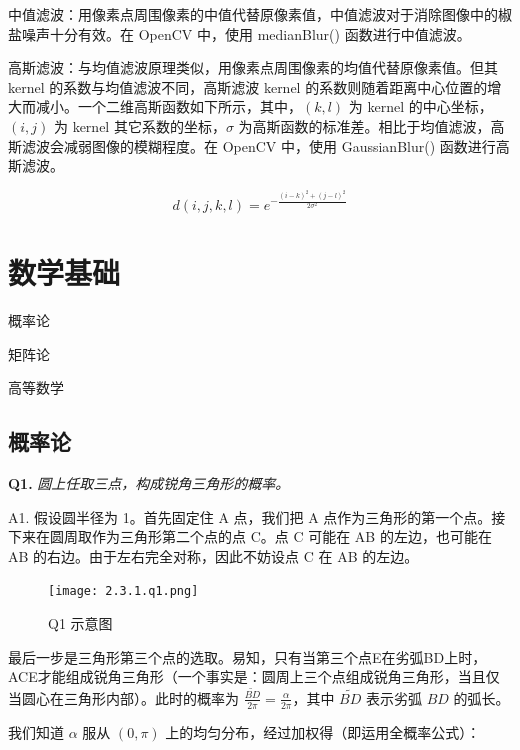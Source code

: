 \documentclass[cn,10pt,math=newtx,citestyle=gb7714-2015,bibstyle=gb7714-2015]{elegantbook}
\begin{document}
中值滤波：用像素点周围像素的中值代替原像素值，中值滤波对于消除图像中的椒盐噪声十分有效。在 OpenCV 中，使用 medianBlur() 函数进行中值滤波。

高斯滤波：与均值滤波原理类似，用像素点周围像素的均值代替原像素值。但其 kernel 的系数与均值滤波不同，高斯滤波 kernel 的系数则随着距离中心位置的增大而减小。一个二维高斯函数如下所示，其中，$(k, l)$ 为 kernel 的中心坐标，$(i, j)$ 为 kernel 其它系数的坐标，$\sigma$ 为高斯函数的标准差。相比于均值滤波，高斯滤波会减弱图像的模糊程度。在 OpenCV 中，使用 GaussianBlur() 函数进行高斯滤波。

\begin{equation}
d(i, j, k, l)=e^{-\frac{(i-k)^{2}+(j-l)^{2}}{2 \sigma^{2}}}
\end{equation}


\newpage


\section{数学基础}

\begin{introduction}
\item 概率论
\item 矩阵论
\item 高等数学
\end{introduction}

\subsection{概率论}

\textbf{Q1.} \textit{圆上任取三点，构成锐角三角形的概率。}

A1. 假设圆半径为 1。首先固定住 A 点，我们把 A 点作为三角形的第一个点。接下来在圆周取作为三角形第二个点的点 C。点 C 可能在 AB 的左边，也可能在 AB 的右边。由于左右完全对称，因此不妨设点 C 在 AB 的左边。

\begin{figure}[ht]
  \centering
  \texttt{[image: 2.3.1.q1.png]}
  \caption{Q1 示意图}
\end{figure}

最后一步是三角形第三个点的选取。易知，只有当第三个点E在劣弧BD上时，ACE才能组成锐角三角形（一个事实是：圆周上三个点组成锐角三角形，当且仅当圆心在三角形内部）。此时的概率为 $\frac{\tilde{BD}}{2\pi}=\frac{\alpha}{2\pi}$，其中 $\tilde{BD}$ 表示劣弧 $BD$ 的弧长。

我们知道 $\alpha$ 服从 $(0,\pi)$ 上的均匀分布，经过加权得（即运用全概率公式）：
\end{document}
